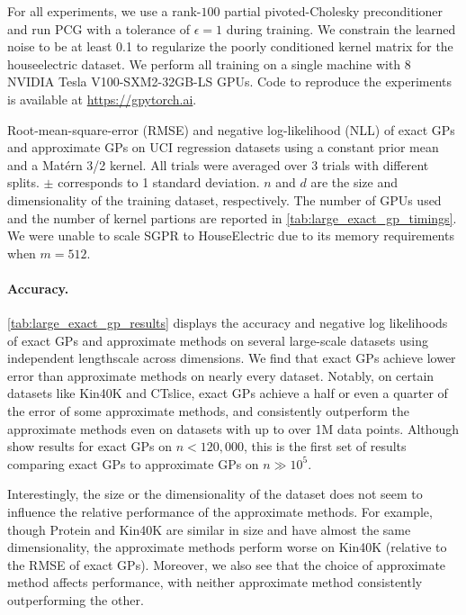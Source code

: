 For all experiments, we use a rank-$100$ partial pivoted-Cholesky preconditioner and
run PCG with a tolerance of $\epsilon = 1$ during training.
We constrain the learned noise to be at least 0.1 to regularize the poorly
conditioned kernel matrix for the houseelectric dataset.
We perform all training on a single machine with 8 NVIDIA Tesla V100-SXM2-32GB-LS GPUs.
Code to reproduce the experiments is available at \url{https://gpytorch.ai}.
\begin{table}[h!]
  \caption{
	  Root-mean-square-error (RMSE) and negative log-likelihood (NLL) of exact GPs and approximate GPs on UCI regression datasets using a constant prior mean and a Mat\'ern 3/2 kernel. All trials were averaged over 3 trials with different splits.  $\pm$ corresponds to 1 standard deviation.
    $n$ and $d$ are the size and dimensionality of the training dataset,
    respectively. The number of GPUs used and the number of kernel partions are reported in \cref{tab:large_exact_gp_timings}.
    We were unable to scale SGPR to HouseElectric due to its memory requirements when $m=512$.
    \vspace{0.3em}
  }
  \label{tab:large_exact_gp_results}
  \centering
  \resizebox{\textwidth}{!}{%
    
  }
\end{table}

\paragraph{Accuracy.}
\cref{tab:large_exact_gp_results} displays the accuracy and negative log likelihoods of exact GPs and approximate methods on several large-scale datasets using independent lengthscale across dimensions.
We find that exact GPs achieve lower error than approximate methods on nearly every dataset. Notably, on certain datasets
like Kin40K and CTslice, exact GPs achieve a half or even a quarter of the error of some approximate methods, and consistently outperform
the approximate methods even on datasets with up to over 1M data points.
Although \citet{nguyen2019exact} show results for exact GPs on $n < 120,\!000$, this is the first set of results comparing exact GPs to approximate GPs on $n\gg 10^5$.

Interestingly, the size or the dimensionality of the dataset does not seem to influence the relative performance of the approximate methods.
For example, though Protein and Kin40K  are similar in size and have almost the same dimensionality, the approximate methods perform worse on Kin40K (relative to the RMSE of exact GPs).
Moreover, we also see that the choice of approximate method affects performance, with neither approximate method consistently outperforming the other.

